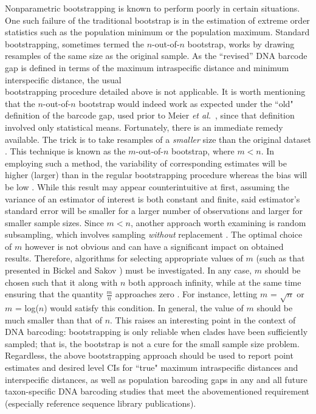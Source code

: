 Nonparametric bootstrapping is known to perform poorly in certain situations. One such failure of the traditional bootstrap is in the estimation of extreme order statistics such as the population minimum or the population maximum. Standard bootstrapping, sometimes termed the $n$-out-of-$n$ bootstrap, works by drawing resamples of the same size as the original sample. As the ``revised'' DNA barcode gap is defined in terms of the maximum intraspecific distance and minimum interspecific distance, the usual \\ bootstrapping procedure detailed above is not applicable. It is worth mentioning that the $n$-out-of-$n$ bootstrap would indeed work as expected under the ``old" definition of the barcode gap, used prior to Meier \textit{et al.}~\cite{meier2008use}, since that definition involved only statistical means. Fortunately, there is an immediate remedy available. The trick is to take resamples of a \textit{smaller} size than the original dataset \cite{bickel1997resampling}. This technique is known as the $m$-out-of-$n$ bootstrap, where $m < n$. In employing such a method, the variability of corresponding estimates will be higher (larger) than in the regular bootstrapping procedure whereas the bias will be low \cite{chernick2007bootstrap, chernick2011bootstrap}. While this result may appear counterintuitive at first, assuming the variance of an estimator of interest is both constant and finite, said estimator's standard error will be smaller for a larger number of observations and larger for smaller sample sizes. Since $m < n$, another approach worth examining is random subsampling, which involves sampling \textit{without} replacement \cite{politis1999subsampling}. The optimal choice of $m$ however is not obvious and can have a significant impact on obtained results. Therefore, algorithms for selecting appropriate values of $m$ (such as that presented in Bickel and Sakov \cite{bickel2008choice}) must be investigated. In any case, $m$ should be chosen such that it along with $n$ both approach infinity, while at the same time ensuring that the quantity $\frac{m}{n}$ approaches zero \cite{chernick2007bootstrap, chernick2011bootstrap}. For instance, letting $m$ = $\sqrt{n}$ or $m$ = log($n$) would satisfy this condition. In general, the value of $m$ should be much smaller than that of $n$. This raises an interesting point in the context of DNA barcoding: bootstrapping is only reliable when clades have been sufficiently sampled; that is, the bootstrap is not a cure for the small sample size problem.  Regardless, the above bootstrapping approach should be used to report point estimates and desired level CIs for ``true" maximum intraspecific distances and interspecific distances, as well as population barcoding gaps in any and all future taxon-specific DNA barcoding studies that meet the abovementioned requirement (especially reference sequence library publications).



